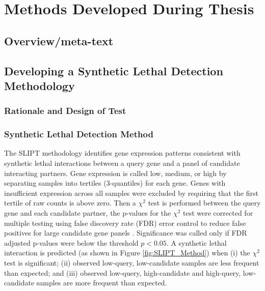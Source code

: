 \chapter{Methods Developed During Thesis}
\label{chap:methods_dev}
\section{Overview/meta-text}
\section{Developing a Synthetic Lethal Detection Methodology}
\subsection{Rationale and Design of Test}
\subsection{Synthetic Lethal Detection Method}
The SLIPT methodology identifies gene expression patterns consistent with synthetic lethal interactions between a query gene and a panel of candidate interacting partners. Gene expression is called low, medium, or high by separating samples into tertiles (3-quantiles) for each gene. Genes with insufficient expression across all samples were excluded by requiring that the first tertile of raw counts is above zero. Then a $\chi^2$ test is performed between the query gene and each candidate partner, the p-values for the $\chi^2$ test were corrected for multiple testing using false discovery rate (FDR) error control to reduce false positives for large candidate gene panels \cite{fdr1995}. Significance was called only if FDR adjusted p-values were below the threshold $p < 0.05$. A synthetic lethal interaction is predicted  (as shown in Figure \ref{fig:SLIPT_Method}) when (i) the $\chi^2$ test is significant; (ii) observed low-query, low-candidate samples are less frequent than expected; and (iii) observed low-query, high-candidate and high-query, low-candidate samples are more frequent than expected.


